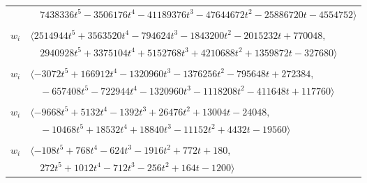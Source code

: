 \documentclass[11pt]{article}
\begin{document}
\begin{longtable}{@{}ll@{}}
 & $\quad 7438336t^{5}-3506176t^{4}-41189376t^{3}-47644672t^{2}-25886720t-4554752\rangle$\\
\addlinespace[2pt]
\multicolumn{2}{@{}p{0.97\textwidth}@{}}{$i=46$, $D_i=8192$, $\rho_{ij}$: $4{:}1, \allowbreak 5{:}1, \allowbreak 7{:}1, \allowbreak 13{:}1, \allowbreak 16{:}1, \allowbreak 23{:}2, \allowbreak 25{:}2, \allowbreak 37{:}2, \allowbreak 38{:}2, \allowbreak 40{:}2, \allowbreak 45{:}1, \allowbreak 65{:}2, \allowbreak 71{:}1$}\\
$w_i$ & $\langle 2514944t^{5}+3563520t^{4}-794624t^{3}-1843200t^{2}-2015232t+770048,$\\
 & $\quad 2940928t^{5}+3375104t^{4}+5152768t^{3}+4210688t^{2}+1359872t-327680\rangle$\\
\addlinespace[2pt]
\multicolumn{2}{@{}p{0.97\textwidth}@{}}{$i=47$, $D_i=1024$, $\rho_{ij}$: $6{:}2, \allowbreak 7{:}1, \allowbreak 10{:}1, \allowbreak 14{:}1, \allowbreak 16{:}2, \allowbreak 19{:}1, \allowbreak 25{:}2, \allowbreak 26{:}2, \allowbreak 33{:}2, \allowbreak 37{:}1, \allowbreak 43{:}1, \allowbreak 58{:}1, \allowbreak 64{:}2$}\\
$w_i$ & $\langle -3072t^{5}+166912t^{4}-1320960t^{3}-1376256t^{2}-795648t+272384,$\\
 & $\quad -657408t^{5}-722944t^{4}-1320960t^{3}-1118208t^{2}-411648t+117760\rangle$\\
\addlinespace[2pt]
\multicolumn{2}{@{}p{0.97\textwidth}@{}}{$i=48$, $D_i=4$, $\rho_{ij}$: $0{:}2, \allowbreak 1{:}2, \allowbreak 2{:}2, \allowbreak 5{:}1, \allowbreak 12{:}2, \allowbreak 13{:}1, \allowbreak 16{:}1, \allowbreak 21{:}2, \allowbreak 27{:}2, \allowbreak 30{:}1, \allowbreak 31{:}2, \allowbreak 36{:}2, \allowbreak 42{:}1, \allowbreak 45{:}2, \allowbreak 60{:}1, \allowbreak 67{:}2$}\\
$w_i$ & $\langle -9668t^{5}+5132t^{4}-1392t^{3}+26476t^{2}+13004t-24048,$\\
 & $\quad -10468t^{5}+18532t^{4}+18840t^{3}-11152t^{2}+4432t-19560\rangle$\\
\addlinespace[2pt]
\multicolumn{2}{@{}p{0.97\textwidth}@{}}{$i=49$, $D_i=4$, $\rho_{ij}$: $0{:}2, \allowbreak 2{:}1, \allowbreak 6{:}2, \allowbreak 7{:}1, \allowbreak 13{:}2, \allowbreak 20{:}1, \allowbreak 21{:}1, \allowbreak 23{:}1, \allowbreak 29{:}1, \allowbreak 37{:}1, \allowbreak 40{:}2, \allowbreak 50{:}1, \allowbreak 62{:}1, \allowbreak 71{:}2$}\\
$w_i$ & $\langle -108t^{5}+768t^{4}-624t^{3}-1916t^{2}+772t+180,$\\
 & $\quad 272t^{5}+1012t^{4}-712t^{3}-256t^{2}+164t-1200\rangle$\\

\end{longtable}
\end{document}
